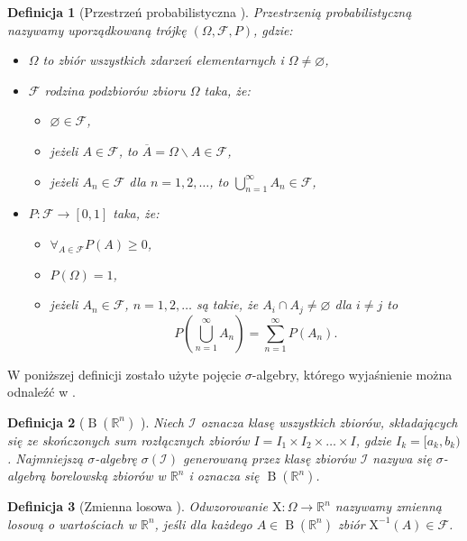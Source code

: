 \documentclass[12pt,a4paper]{report}
\newtheorem{df}{Definicja}[chapter]
\newcommand{\setR}{\mathbb{R}}
\newcommand{\sigmacialo}[1]{\operatorname{B}\left({#1} \right)}
\begin{document}
\begin{df}[Przestrzeń probabilistyczna {\citep[Sec 1.2, Sec 1.4]{wztp}}]
Przestrzenią probabilistyczną nazywamy uporządkowaną trójkę $(\Omega, \mathcal{F}, P)$, gdzie:
\begin{itemize}
\item $\Omega$ to zbiór wszystkich zdarzeń elementarnych i $\Omega \neq \varnothing$,
\item $ \mathcal{F} $ rodzina podzbiorów zbioru $\Omega$ taka, że:
\begin{itemize}
\item $\varnothing \in \mathcal{F} $,
\item jeżeli $ \mathit{A} \in \mathcal{F}$, to $\overline{\mathit{A}} = \Omega \backslash \mathit{A} \in \mathcal{F}$,
\item jeżeli $ \mathit{A}_n \in \mathcal{F}$ dla $n=1,2,\ldots$, to $\bigcup_{n=1}^{\infty} \mathit{A}_n \in \mathcal{F}$,
\end{itemize}
\item $P : \mathcal{F} \to [0,1]$ taka, że:
\begin{itemize}
\item $\forall_{\mathit{A} \in \mathcal{F}} P(\mathit{A}) \geq 0$,
\item $P(\Omega) = 1$,
\item jeżeli $ \mathit{A}_n \in \mathcal{F}$, $n=1,2,\ldots$ są takie, że $\mathit{A}_i \cap \mathit{A}_j \neq \varnothing$ dla $i \neq j$ to
$$
P(\bigcup_{n=1}^{\infty} \mathit{A}_n) = \sum_{n=1}^{\infty} P(\mathit{A}_n).
$$
\end{itemize}
\end{itemize}
\end{df}

W poniższej definicji zostało użyte pojęcie $\sigma$-algebry, którego wyjaśnienie można odnaleźć w {\citep[Sec 1.2 Def. 1.2]{wztp}}.

\begin{df}[$\sigmacialo{\setR^n}$ {\citep[Sec 1.12]{wztp}}]
Niech $\mathcal{I}$ oznacza klasę wszystkich zbiorów, składających się ze skończonych sum rozłącznych zbiorów $\mathit{I} = \mathit{I}_1 \times \mathit{I}_2 \times \ldots \times \mathit{I}$, gdzie $\mathit{I}_k = [a_k,b_k)$.
Najmniejszą $\sigma$-algebrę $\sigma(\mathcal{I})$ generowaną przez klasę zbiorów $\mathcal{I}$ nazywa się $\sigma$-algebrą borelowską zbiorów w $\setR^n$ i oznacza się $\sigmacialo{\setR^n}$.
\end{df}

\begin{df}[Zmienna losowa {\citep[Sec 5.1 Def. 1]{jakubowski}}]
Odwzorowanie $\mathrm{X}: \Omega \to \setR^n$ nazywamy zmienną losową o wartościach w $\setR^n$, jeśli dla każdego $\mathit{A} \in \sigmacialo{\setR^n}$ zbiór $\mathrm{X}^{-1}(\mathit{A}) \in \mathcal{F}$.
\end{df}
\end{document}
